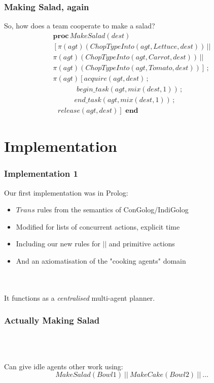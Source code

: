 \documentclass{beamer}
\begin{document}
\begin{frame}
\frametitle{Making Salad, again}
So, how does a team cooperate to make a salad?
\[
\begin{array}{c}
\mathbf{proc}\, MakeSalad(dest)\\
\left[\pi(agt)(ChopTypeInto(agt,Lettuce,dest))\,||\right.\\
\pi(agt)(ChopTypeInto(agt,Carrot,dest))\,||\\
\left.\pi(agt)(ChopTypeInto(agt,Tomato,dest))\right]\,;\\
\pi(agt)\left[acquire(agt,dest)\,;\right.\\
\,\,\,\,\,\,\,\,\,\,\,\,\,\,\,\,\,\,\,\, begin\_ task(agt,mix(dest,1))\,;\\
\,\,\,\,\,\,\,\,\,\,\,\,\,\,\,\,\,\, end\_ task(agt,mix(dest,1))\,;\\
\left.\,\,\,\, release(agt,dest)\right]\,\,\mathbf{end}\end{array}\]
\end{frame}

\section{Implementation}

\begin{frame}
\frametitle{Implementation 1}
Our first implementation was in Prolog:
\begin{itemize}
  \item $Trans$ rules from the semantics of ConGolog/IndiGolog
  \pause
  \item Modified for lists of concurrent actions, explicit time
  \pause
  \item Including our new rules for $||$ and primitive actions
  \pause
  \item And an axiomatisation of the "cooking agents" domain
\end{itemize}
\ \\
\ \\
\pause
It functions as a \emph{centralised} multi-agent planner.
\end{frame}

\begin{frame}
\frametitle{Actually Making Salad}
\begin{columns}
  \begin{column}{0.5\textwidth}
  \end{column}
  \begin{column}{0.5\textwidth}
  \end{column}
\end{columns}
\ \\
\ \\
Can give idle agents other work using:\[
MakeSalad(Bowl1)\ ||\ MakeCake(Bowl2)\ ||\ \dots\]
\end{frame}
\end{document}
